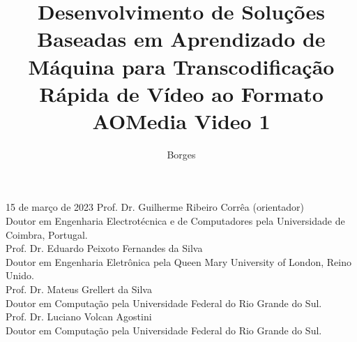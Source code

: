\documentclass[tese,capa]{texufpel}
\title{Desenvolvimento de Soluções Baseadas em Aprendizado de Máquina para Transcodificação Rápida de Vídeo ao Formato AOMedia Video 1}
\author{Borges}{Alex Machado}
\begin{document}


\maketitle 

\sloppy




\begin{aprovacao}{15 de março de 2023} %
\noindent Prof. Dr. Guilherme Ribeiro Corrêa (orientador)\\
Doutor em Engenharia Electrotécnica e de Computadores pela Universidade de Coimbra, Portugal.\\[1cm]

\noindent Prof. Dr. Eduardo Peixoto Fernandes da Silva\\
Doutor em Engenharia Eletrônica pela Queen Mary University of London, Reino Unido.\\[1cm]

\noindent Prof. Dr. Mateus Grellert da Silva\\
Doutor em Computação pela Universidade Federal do Rio Grande do Sul.\\[1cm]

\noindent Prof. Dr. Luciano Volcan Agostini\\
Doutor em Computação pela Universidade Federal do Rio Grande do Sul.
\end{aprovacao}

\end{document}
